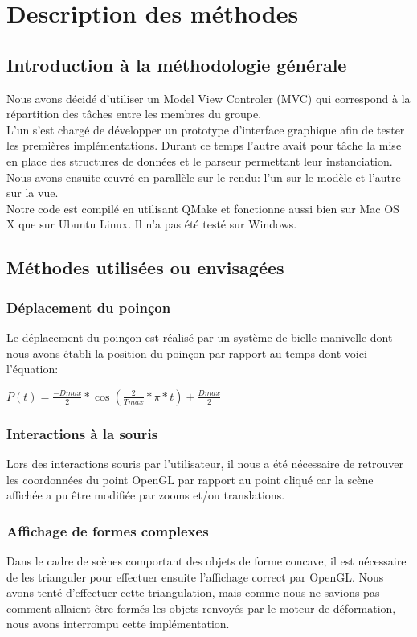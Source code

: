 \documentclass[a4paper, 11pt]{article}
\begin{document}
\section{Description des méthodes}
\subsection{Introduction à la méthodologie générale}
Nous avons décidé d'utiliser un Model View Controler (MVC) qui correspond à la répartition des tâches entre les membres du groupe.\\
L'un s'est chargé de développer un prototype d'interface graphique afin de tester les premières implémentations.
Durant ce temps l'autre avait pour tâche la mise en place des structures de données et le parseur permettant leur instanciation.\\
Nous avons ensuite œuvré en parallèle sur le rendu: l'un sur le modèle et l'autre sur la vue.\\
Notre code est compilé en utilisant QMake et fonctionne aussi bien sur Mac OS X que sur Ubuntu Linux.
Il n'a pas été testé sur Windows.

\subsection{Méthodes utilisées ou envisagées}
\subsubsection{Déplacement du poinçon}
Le déplacement du poinçon est réalisé par un système de bielle manivelle dont nous avons établi la position du poinçon par rapport au temps dont voici l'équation:\\
\begin{center}
    $P(t) = \frac{-Dmax}{2}*\cos(\frac{2}{Tmax}*\pi*t)+\frac{Dmax}{2}$
\end{center}

\subsubsection{Interactions à la souris}
Lors des interactions souris par l'utilisateur, il nous a été nécessaire de retrouver les coordonnées du point OpenGL par rapport au point cliqué car la scène affichée a pu être modifiée par zooms et/ou translations.

\subsubsection{Affichage de formes complexes}
Dans le cadre de scènes comportant des objets de forme concave, il est nécessaire de les trianguler pour effectuer ensuite l'affichage correct par OpenGL.
Nous avons tenté d'effectuer cette triangulation, mais comme nous ne savions pas comment allaient être formés les objets renvoyés par le moteur de déformation, nous avons interrompu cette implémentation.
\end{document}
